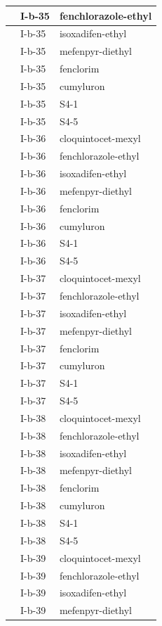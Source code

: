 \documentclass[11pt,a4paper]{article}
\begin{document}
\begin{table}[h]
\begin{tabular}{|l|l|l|}
 & I-b-35 & fenchlorazole-ethyl \\ \hline
 & I-b-35 & isoxadifen-ethyl \\ \hline
 & I-b-35 & mefenpyr-diethyl \\ \hline
 & I-b-35 & fenclorim \\ \hline
 & I-b-35 & cumyluron \\ \hline
 & I-b-35 & S4-1 \\ \hline
 & I-b-35 & S4-5 \\ \hline
 & I-b-36 & cloquintocet-mexyl \\ \hline
 & I-b-36 & fenchlorazole-ethyl \\ \hline
 & I-b-36 & isoxadifen-ethyl \\ \hline
 & I-b-36 & mefenpyr-diethyl \\ \hline
 & I-b-36 & fenclorim \\ \hline
 & I-b-36 & cumyluron \\ \hline
 & I-b-36 & S4-1 \\ \hline
 & I-b-36 & S4-5 \\ \hline
 & I-b-37 & cloquintocet-mexyl \\ \hline
 & I-b-37 & fenchlorazole-ethyl \\ \hline
 & I-b-37 & isoxadifen-ethyl \\ \hline
 & I-b-37 & mefenpyr-diethyl \\ \hline
 & I-b-37 & fenclorim \\ \hline
 & I-b-37 & cumyluron \\ \hline
 & I-b-37 & S4-1 \\ \hline
 & I-b-37 & S4-5 \\ \hline
 & I-b-38 & cloquintocet-mexyl \\ \hline
 & I-b-38 & fenchlorazole-ethyl \\ \hline
 & I-b-38 & isoxadifen-ethyl \\ \hline
 & I-b-38 & mefenpyr-diethyl \\ \hline
 & I-b-38 & fenclorim \\ \hline
 & I-b-38 & cumyluron \\ \hline
 & I-b-38 & S4-1 \\ \hline
 & I-b-38 & S4-5 \\ \hline
 & I-b-39 & cloquintocet-mexyl \\ \hline
 & I-b-39 & fenchlorazole-ethyl \\ \hline
 & I-b-39 & isoxadifen-ethyl \\ \hline
 & I-b-39 & mefenpyr-diethyl \\ \hline

\end{tabular}
\end{table}
\end{document}
